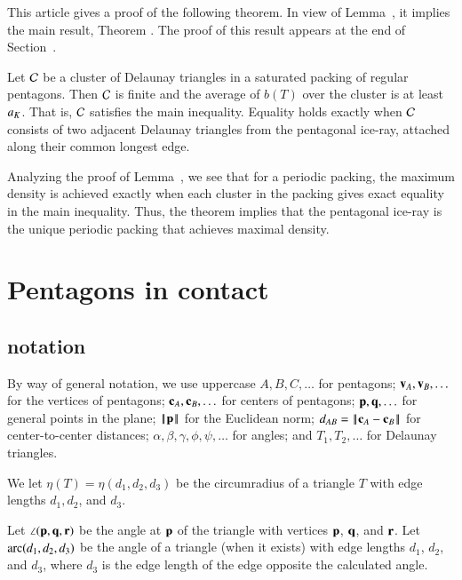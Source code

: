 This article gives a proof of the following theorem. In view of Lemma~,
it implies the main result, Theorem .  The proof of this result appears
at the end of Section~.

\begin{theorem}
  Let $\mathcal C$ be a cluster of Delaunay triangles in a saturated
  packing of regular pentagons.  Then $\mathcal C$ is finite and the average
  of $b(T)$ over the cluster is at least $a_K$.  That is, $\mathcal C$
  satisfies the main inequality.  Equality holds exactly when $\mathcal C$
  consists of two adjacent Delaunay triangles from the pentagonal ice-ray, 
attached along their common longest edge.
\end{theorem}

\begin{remark}
Analyzing the proof of Lemma~, we see that for a
periodic packing, the maximum density is achieved exactly when each
 cluster in the packing gives exact equality in the main inequality.
Thus, the theorem implies that the pentagonal ice-ray  is the
unique periodic packing that achieves maximal density.
\end{remark}



\section{Pentagons in contact}


\subsection{notation}

By way of general notation, we use uppercase $A,B,C,\ldots$ for
pentagons; ${\mathbf v}_A,{\mathbf v}_B,\ldots$ for the vertices of pentagons;
${\mathbf c}_A,{\mathbf c}_B,\ldots$ for centers of pentagons; ${\mathbf p},{\mathbf q},\ldots$ for
general points in the plane; ${\hbox{\ensuremath{\hspace{0.1em}|\hspace{-0.1em}|\hspace{0.1em}}}{\mathbf p}\hbox{\ensuremath{\hspace{0.1em}|\hspace{-0.1em}|\hspace{0.1em}}}}$ for the Euclidean norm;
$\dx{AB}=\dd{A}{B}$ for center-to-center distances;
$\alpha,\beta,\gamma,\phi,\psi,\ldots$ for angles; and $T_1,T_2,\ldots$
for Delaunay triangles.

We let $\eta(T) = \eta(d_1,d_2,d_3)$ be the circumradius of a triangle
$T$ with edge lengths $d_1,d_2$, and $d_3$.

Let $\angle({\mathbf p},{\mathbf q},{\mathbf r})$ be the angle at ${\mathbf p}$ of the triangle with
vertices ${\mathbf p}$, ${\mathbf q}$, and ${\mathbf r}$.  Let $\operatorname{arc}(d_1,d_2,d_3)$ be the angle
of a triangle (when it exists) with edge lengths $d_1$, $d_2$, and
$d_3$, where $d_3$ is the edge length of the edge opposite the
calculated angle.



